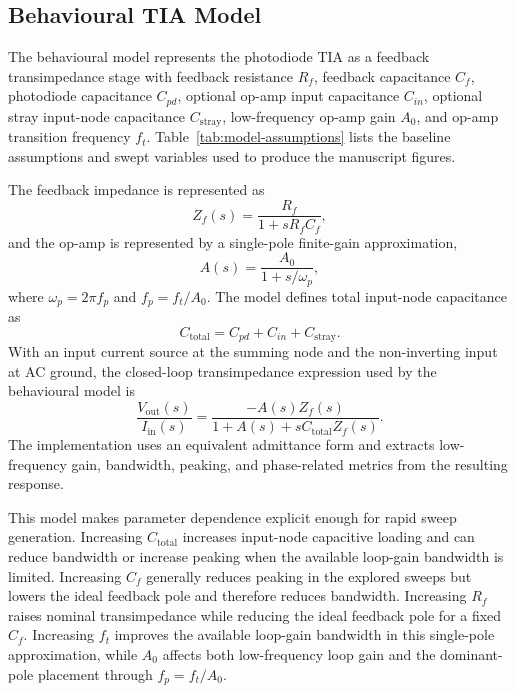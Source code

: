 \subsection{Behavioural TIA Model}

The behavioural model represents the photodiode TIA as a feedback transimpedance stage with feedback resistance $R_f$, feedback capacitance $C_f$, photodiode capacitance $C_{pd}$, optional op-amp input capacitance $C_{in}$, optional stray input-node capacitance $C_{\mathrm{stray}}$, low-frequency op-amp gain $A_0$, and op-amp transition frequency $f_t$. Table~\ref{tab:model-assumptions} lists the baseline assumptions and swept variables used to produce the manuscript figures.

The feedback impedance is represented as
\begin{equation}
Z_f(s)=\frac{R_f}{1+sR_fC_f},
\end{equation}
and the op-amp is represented by a single-pole finite-gain approximation,
\begin{equation}
A(s)=\frac{A_0}{1+s/\omega_p},
\end{equation}
where $\omega_p=2\pi f_p$ and $f_p=f_t/A_0$. The model defines total input-node capacitance as
\begin{equation}
C_{\mathrm{total}} = C_{pd}+C_{in}+C_{\mathrm{stray}}.
\end{equation}
With an input current source at the summing node and the non-inverting input at AC ground, the closed-loop transimpedance expression used by the behavioural model is
\begin{equation}
\frac{V_{\mathrm{out}}(s)}{I_{\mathrm{in}}(s)} =
\frac{-A(s)Z_f(s)}{1+A(s)+sC_{\mathrm{total}}Z_f(s)}.
\end{equation}
The implementation uses an equivalent admittance form and extracts low-frequency gain, bandwidth, peaking, and phase-related metrics from the resulting response.

This model makes parameter dependence explicit enough for rapid sweep generation. Increasing $C_{\mathrm{total}}$ increases input-node capacitive loading and can reduce bandwidth or increase peaking when the available loop-gain bandwidth is limited. Increasing $C_f$ generally reduces peaking in the explored sweeps but lowers the ideal feedback pole and therefore reduces bandwidth. Increasing $R_f$ raises nominal transimpedance while reducing the ideal feedback pole for a fixed $C_f$. Increasing $f_t$ improves the available loop-gain bandwidth in this single-pole approximation, while $A_0$ affects both low-frequency loop gain and the dominant-pole placement through $f_p=f_t/A_0$.

